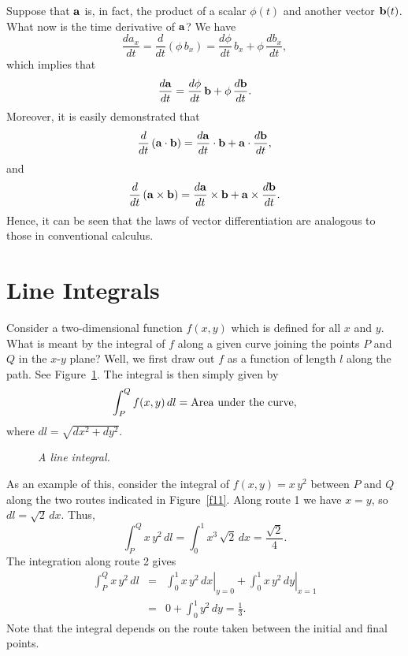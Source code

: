 Suppose that ${\bf a}$ is, in fact, the product of a scalar $\phi(t)$ and another vector
${\bf b}(t)$. What now is the time derivative of ${\bf a}$? We have
\begin{equation}
\frac{d a_x}{dt} = \frac{d}{dt}\!\left(\phi\, b_x\right) = \frac{d\phi}{dt}\, b_x + \phi \,
\frac{d b_x}{dt},
\end{equation}
which implies that
\begin{equation}
\frac{d {\bf a}}{dt} = \frac{d\phi}{dt}\, {\bf b} + \phi\, \frac{d {\bf b}}{dt}.
\end{equation}
Moreover, it is easily demonstrated that 
\begin{equation}
\frac{d}{dt}\left({\bf a}\cdot{\bf b}\right) = \frac{d{\bf a}}{dt}\cdot {\bf b} +{\bf a}\cdot\frac{d{\bf b}}{dt},
\end{equation}
and
\begin{equation}
\frac{d}{dt}\left({\bf a}\times{\bf b}\right) = \frac{d{\bf a}}{dt}\times{\bf b} + {\bf a}\times
\frac{d{\bf b}}{dt}.
\end{equation}
Hence, it can be seen that the laws of vector differentiation are analogous to those in 
conventional calculus.

\section{Line Integrals}
Consider a two-dimensional function $f(x,y)$ which is defined for all $x$ and $y$. 
What is meant by the integral of $f$ along a given curve joining the points $P$ and $Q$ in the $x$-$y$ plane?
Well, we first draw out $f$ as a function of length $l$ along the path. See Figure~\ref{f10}. The integral is then simply given
by
\begin{equation}
\int_{P}^Q f(x,y)\,dl = {\rm Area~under~the~curve},
\end{equation}
where $dl=\sqrt{dx^2+dy^2}$. 

\begin{figure}
\centerline{}
\caption{\em A line integral.}\label{f10}
\end{figure}

As an example of this, consider the integral of $f(x,y)= x\,y^2$ between $P$ and $Q$ along the
two routes indicated in Figure~\ref{f11}.
Along route 1 we have $x=y$, so $dl= \sqrt{2}\, dx$. Thus,
\begin{equation}
\int_P^Q x\,y^2\,dl = \int_0^1 x^3\,\sqrt{2} \,dx = \frac{\sqrt{2}}{4}.
\end{equation}
The integration along route 2 gives
\begin{eqnarray}
\int_P^Q x\,y^2\,dl &=& \left.\int_0^1 x\,y^2\,dx\right|_{y=0}+\left.\int_0^1 x\,y^2 \,dy
\right|_{x=1}\nonumber\\[0.5ex]
&=& 0 + \int_0^1 y^2\,dy = \frac{1}{3}.
\end{eqnarray}
Note that the integral depends on the route taken between the initial and final points. 

